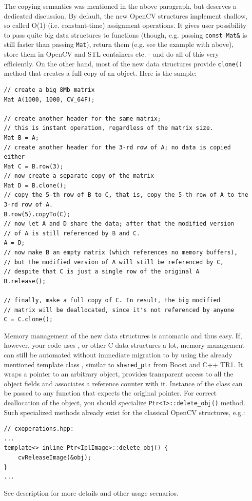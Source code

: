 The copying semantics was mentioned in the above paragraph, but deserves a dedicated discussion.
By default, the new OpenCV structures implement shallow, so called O(1) (i.e. constant-time) assignment operations. It gives user possibility to pass quite big data structures to functions (though, e.g. passing \texttt{const Mat\&} is still faster than passing \texttt{Mat}), return them (e.g. see the example with  above), store them in OpenCV and STL containers etc. - and do all of this very efficiently. On the other hand, most of the new data structures provide \texttt{clone()} method that creates a full copy of an object. Here is the sample:
\begin{lstlisting}
// create a big 8Mb matrix
Mat A(1000, 1000, CV_64F);

// create another header for the same matrix;
// this is instant operation, regardless of the matrix size.
Mat B = A;
// create another header for the 3-rd row of A; no data is copied either
Mat C = B.row(3);
// now create a separate copy of the matrix
Mat D = B.clone();
// copy the 5-th row of B to C, that is, copy the 5-th row of A to the 3-rd row of A.
B.row(5).copyTo(C);
// now let A and D share the data; after that the modified version
// of A is still referenced by B and C.
A = D;
// now make B an empty matrix (which references no memory buffers),
// but the modified version of A will still be referenced by C,
// despite that C is just a single row of the original A
B.release(); 
             
// finally, make a full copy of C. In result, the big modified
// matrix will be deallocated, since it's not referenced by anyone
C = C.clone();
\end{lstlisting}

Memory management of the new data structures is automatic and thus easy. If, however, your code uses ,
 or other C data structures a lot, memory management can still be automated without immediate migration
to  by using the already mentioned template class , similar to \texttt{shared\_ptr} from Boost and C++ TR1.
It wraps a pointer to an arbitrary object, provides transparent access to all the object fields and associates a reference counter with it.
Instance of the class can be passed to any function that expects the original pointer. For correct deallocation of the object, you should specialize \texttt{Ptr<T>::delete\_obj()} method. Such specialized methods already exist for the classical OpenCV structures, e.g.:
\begin{lstlisting}
// cxoperations.hpp:
...
template<> inline Ptr<IplImage>::delete_obj() {
    cvReleaseImage(&obj);
}
...
\end{lstlisting}
See  description for more details and other usage scenarios.


